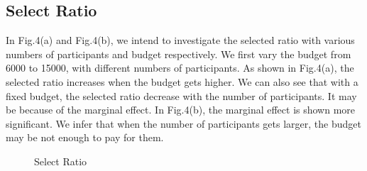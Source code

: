 \documentclass[conference,compsocconf,letterpaper,10pt]{IEEEtran}
\begin{document}
\subsection{Select Ratio}
In Fig.4(a) and Fig.4(b), we intend to investigate the selected ratio with various numbers of participants and budget respectively. We first vary the budget from 6000 to 15000, with different numbers of participants. As shown in Fig.4(a), the selected ratio increases when the budget gets higher. We can also see that with a fixed budget, the selected ratio decrease with the number of participants. It may be because of the marginal effect. In Fig.4(b), the marginal effect is shown more significant. We infer that when the number of participants gets larger, the budget may be not enough to pay for them. 
\begin{figure}[!t]
  \centering
  \vspace{-0.2cm}
  \caption{Select Ratio}
  \vspace{-0.2cm}
\end{figure}
\end{document}
